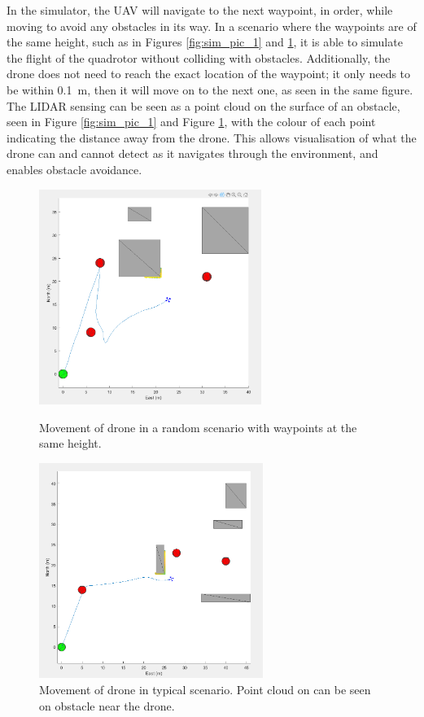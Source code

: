 In the simulator, the UAV will navigate to the next waypoint, in order, while moving to avoid any obstacles in its way. In a scenario where the waypoints are of the same height, such as in Figures \ref{fig:sim_pic_1} and \ref{fig:sim_pic_4}, it is able to simulate the flight of the quadrotor without colliding with obstacles. Additionally, the drone does not need to reach the exact location of the waypoint; it only needs to be within \SI{0.1}{\meter}, then it will move on to the next one, as seen in the same figure. The LIDAR sensing can be seen as a point cloud on the surface of an obstacle, seen in Figure \ref{fig:sim_pic_1} and Figure \ref{fig:sim_pic_4}, with the colour of each point indicating the distance away from the drone. This allows visualisation of what the drone can and cannot detect as it navigates through the environment, and enables obstacle avoidance.
\begin{figure}[H]
    \centering
    \begin{minipage}[b]{0.45\textwidth}
        \includegraphics[height=7cm,keepaspectratio]{./img/sim_pic_1.png}
        \caption{Movement of drone in a random scenario with waypoints at the same height.}
        \label{fig:sim_pic_1}
    \end{minipage}
    \hfill
    \begin{minipage}[b]{0.45\textwidth}
        \includegraphics[height=7cm,keepaspectratio]{./img/sim_pic_4.png}
        \caption{Movement of drone in typical scenario. Point cloud on can be seen on obstacle near the drone.}
        \label{fig:sim_pic_4}
    \end{minipage}
\end{figure}

